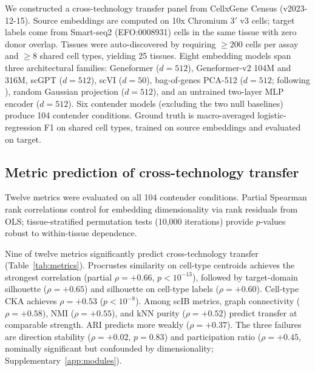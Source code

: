 \documentclass[11pt]{article}
\begin{document}
We constructed a cross-technology transfer panel from CellxGene Census
(v2023-12-15). Source embeddings are computed on 10x Chromium 3$'$ v3
cells; target labels come from Smart-seq2 (EFO:0008931) cells in the
same tissue with zero donor overlap. Tissues were auto-discovered by
requiring $\geq 200$ cells per assay and $\geq 8$ shared cell types,
yielding 25 tissues. Eight embedding models
span three architectural families: Geneformer \citep{theodoris2023geneformer}
($d = 512$), Geneformer-v2 104M and 316M, scGPT \citep{cui2024scgpt}
($d = 512$), scVI \citep{lopez2018scvi} ($d = 50$), bag-of-genes
PCA-512 ($d = 512$; following \citealp{cole2026morpheus}), random
Gaussian projection ($d = 512$), and an untrained two-layer MLP encoder
($d = 512$). Six contender models (excluding the two null baselines)
produce 104 contender conditions. Ground truth is macro-averaged
logistic-regression F1 on shared cell types, trained on source
embeddings and evaluated on target.


\subsection{Metric prediction of cross-technology transfer}
\label{sec:prediction}

Twelve metrics were evaluated on all 104 contender conditions. Partial
Spearman rank correlations control for embedding dimensionality via rank
residuals from OLS; tissue-stratified permutation tests (10,000
iterations) provide $p$-values robust to within-tissue dependence.

Nine of twelve metrics significantly predict cross-technology transfer
(Table~\ref{tab:metrics}). Procrustes similarity on cell-type centroids
achieves the strongest correlation (partial $\rho = +0.66$,
$p < 10^{-13}$), followed by target-domain silhouette ($\rho = +0.65$)
and silhouette on cell-type labels ($\rho = +0.60$). Cell-type CKA
achieves $\rho = +0.53$ ($p < 10^{-8}$). Among scIB metrics, graph
connectivity ($\rho = +0.58$), NMI ($\rho = +0.55$), and kNN purity
($\rho = +0.52$) predict transfer at comparable strength. ARI predicts
more weakly ($\rho = +0.37$). The three failures are
direction stability ($\rho = +0.02$, $p = 0.83$) and
participation ratio ($\rho = +0.45$, nominally significant but
confounded by dimensionality; Supplementary~\ref{app:modules}).
\end{document}

